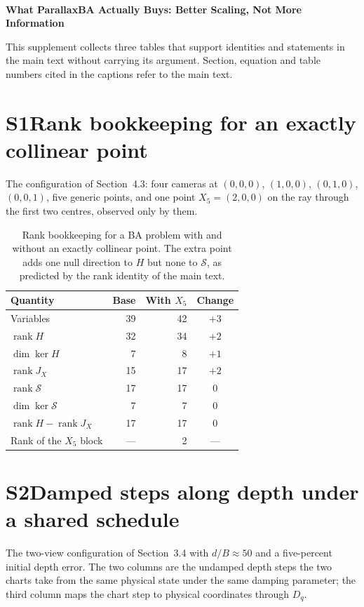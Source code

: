 \documentclass[11pt,a4paper]{article}
\DeclareMathOperator{\rank}{rank}
\begin{document}
\\[3pt]
{\large\bfseries What ParallaxBA Actually Buys: Better Scaling, Not More Information}

\medskip
\noindent This supplement collects three tables that support identities and statements in the main text without carrying its argument. Section, equation and table numbers cited in the captions refer to the main text.

\section*{S1\quad Rank bookkeeping for an exactly collinear point}

The configuration of Section~4.3: four cameras at $(0,0,0)$, $(1,0,0)$, $(0,1,0)$, $(0,0,1)$, five generic points, and one point $X_5=(2,0,0)$ on the ray through the first two centres, observed only by them.

\begin{table}[h]
\centering
\caption{Rank bookkeeping for a BA problem with and without an exactly collinear point. The extra point adds one null direction to $H$ but none to $\mathcal S$, as predicted by the rank identity of the main text.}
\label{tab:collinear}
\begin{tabular}{lrrc}
\toprule
Quantity & Base & With $X_5$ & Change \\
\midrule
Variables & 39 & 42 & $+3$ \\
$\rank H$ & 32 & 34 & $+2$ \\
$\dim\ker H$ & 7 & 8 & $+1$ \\
$\rank J_X$ & 15 & 17 & $+2$ \\
$\rank\mathcal S$ & 17 & 17 & $0$ \\
$\dim\ker\mathcal S$ & 7 & 7 & $0$ \\
$\rank H-\rank J_X$ & 17 & 17 & $0$ \\
Rank of the $X_5$ block & --- & 2 & --- \\
\bottomrule
\end{tabular}
\end{table}

\section*{S2\quad Damped steps along depth under a shared schedule}

The two-view configuration of Section~3.4 with $d/B\approx50$ and a five-percent initial depth error. The two columns are the undamped depth steps the two charts take from the same physical state under the same damping parameter; the third column maps the chart step to physical coordinates through $D_q$.
\end{document}
